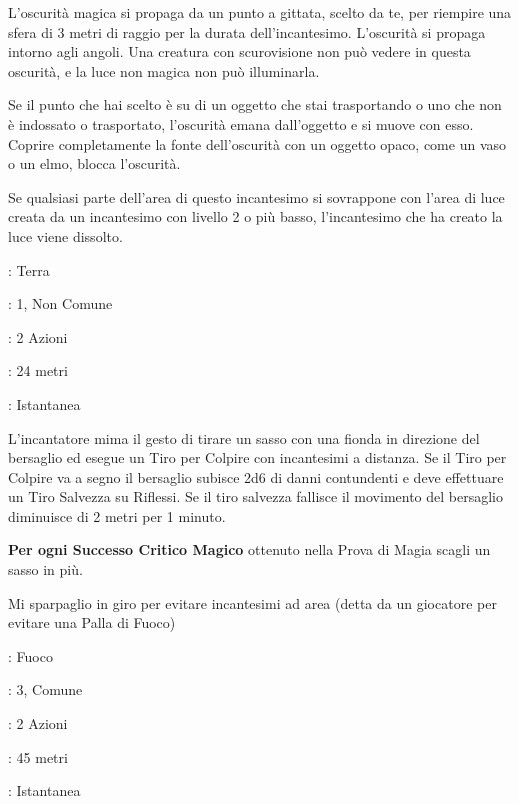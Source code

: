 \begin{multicols}{2}
L'oscurità magica si propaga da un punto a gittata, scelto da te, per riempire una sfera di 3 metri di raggio per la durata dell'incantesimo. L'oscurità si propaga intorno agli angoli. Una creatura con scurovisione non può vedere in questa oscurità, e la luce non magica non può illuminarla.

Se il punto che hai scelto è su di un oggetto che stai trasportando o uno che non è indossato o trasportato, l'oscurità emana dall'oggetto e si muove con esso. Coprire completamente la fonte dell'oscurità con un oggetto opaco, come un vaso o un elmo, blocca l'oscurità.

Se qualsiasi parte dell'area di questo incantesimo si sovrappone con l'area di luce creata da un incantesimo con livello 2 o più basso, l'incantesimo che ha creato la luce viene dissolto.

\noindent\colorbox{OBSSgold!10}{
\begin{minipage}{0.95\linewidth}
\begin{description}[noitemsep, topsep=0pt, parsep=0pt, partopsep=0pt, leftmargin=0cm, labelwidth=1.3cm]
	\item[\textbf{Lista}]: Terra
	\item[\textbf{Livello}]: 1, Non Comune
	\item[\textbf{Lancio}]: 2 Azioni
	\item[\textbf{Gittata}]: 24 metri
	\item[\textbf{Durata}]: Istantanea
\end{description}
\end{minipage}}\smallskip

L'incantatore mima il gesto di tirare un sasso con una fionda in direzione del bersaglio ed esegue un Tiro per Colpire con incantesimi a distanza.
Se il Tiro per Colpire va a segno il bersaglio subisce 2d6 di danni contundenti e deve effettuare un Tiro Salvezza su Riflessi. Se il tiro salvezza fallisce il movimento del bersaglio diminuisce di 2 metri per 1 minuto.

\textbf{Per ogni Successo Critico Magico} ottenuto nella Prova di Magia scagli un sasso in più.

\begin{enfasi}{
			Mi sparpaglio in giro per evitare incantesimi ad area (detta da un giocatore per evitare una Palla di Fuoco)
}\end{enfasi}

\noindent\colorbox{OBSSgold!10}{
\begin{minipage}{0.95\linewidth}
\begin{description}[noitemsep, topsep=0pt, parsep=0pt, partopsep=0pt, leftmargin=0cm, labelwidth=1.3cm]
	\item[\textbf{Lista}]: Fuoco
	\item[\textbf{Livello}]: 3, Comune
	\item[\textbf{Lancio}]: 2 Azioni
	\item[\textbf{Gittata}]: 45 metri
	\item[\textbf{Durata}]: Istantanea
\end{description}
\end{minipage}}\smallskip


\end{multicols}

